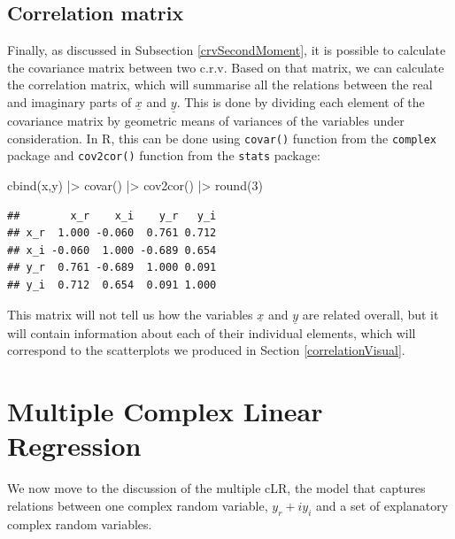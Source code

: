 \documentclass[
]{book}
\newenvironment{Shaded}{\begin{snugshade}}{\end{snugshade}}
\newcommand{\DecValTok}[1]{\textcolor[rgb]{0.00,0.00,0.81}{#1}}
\newcommand{\FunctionTok}[1]{\textcolor[rgb]{0.00,0.00,0.00}{#1}}
\newcommand{\NormalTok}[1]{#1}
\newcommand{\SpecialCharTok}[1]{\textcolor[rgb]{0.00,0.00,0.00}{#1}}
\begin{document}
\hypertarget{correlation-matrix}{%
\section{Correlation matrix}\label{correlation-matrix}}

Finally, as discussed in Subsection \ref{crvSecondMoment}, it is possible to calculate the covariance matrix between two c.r.v. Based on that matrix, we can calculate the correlation matrix, which will summarise all the relations between the real and imaginary parts of \(\underline{x}\) and \(\underline{y}\). This is done by dividing each element of the covariance matrix by geometric means of variances of the variables under consideration. In R, this can be done using \texttt{covar()} function from the \texttt{complex} package and \texttt{cov2cor()} function from the \texttt{stats} package:

\begin{Shaded}
\begin{Highlighting}[]
\FunctionTok{cbind}\NormalTok{(x,y) }\SpecialCharTok{|\textgreater{}} \FunctionTok{covar}\NormalTok{() }\SpecialCharTok{|\textgreater{}} \FunctionTok{cov2cor}\NormalTok{() }\SpecialCharTok{|\textgreater{}} \FunctionTok{round}\NormalTok{(}\DecValTok{3}\NormalTok{)}
\end{Highlighting}
\end{Shaded}

\begin{verbatim}
##        x_r    x_i    y_r   y_i
## x_r  1.000 -0.060  0.761 0.712
## x_i -0.060  1.000 -0.689 0.654
## y_r  0.761 -0.689  1.000 0.091
## y_i  0.712  0.654  0.091 1.000
\end{verbatim}

This matrix will not tell us how the variables \(\underline{x}\) and \(\underline{y}\) are related overall, but it will contain information about each of their individual elements, which will correspond to the scatterplots we produced in Section \ref{correlationVisual}.

\hypertarget{multipleCLR}{%
\chapter{Multiple Complex Linear Regression}\label{multipleCLR}}

We now move to the discussion of the multiple cLR, the model that captures relations between one complex random variable, \(y_r + i y_i\) and a set of explanatory complex random variables.
\end{document}
